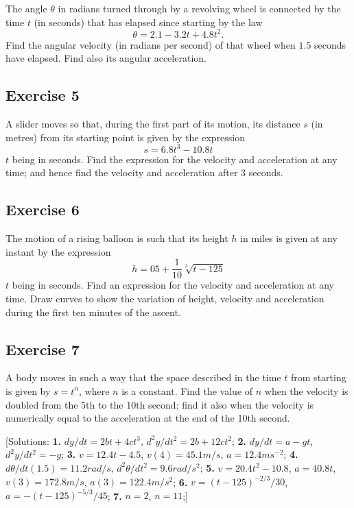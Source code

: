 \documentclass[
  english,
  11pt,
  oneside]{book}
\newcommand{\slide}{}
\theoremstyle{definition}
\theoremstyle{definition}
\theoremstyle{definition}
\theoremstyle{definition}
\theoremstyle{remark}
\begin{document}
The angle \(\theta\) in radians turned through by a revolving wheel is connected by the time \(t\) (in seconds) that has elapsed since starting by the law
\[\theta = 2.1 - 3.2t + 4.8t^2.\]
Find the angular velocity (in radians per second) of that wheel when \(1.5\) seconds have elapsed. Find also its angular acceleration.

\slide

\subsection*{Exercise 5}\label{exercise-5-1}

A slider moves so that, during the first part of its motion, its distance \(s\) (in metres) from its starting point is given by the expression
\[s = 6.8t^3 - 10.8t\]
\(t\) being in seconds. Find the expression for the velocity and acceleration at any time; and hence find the velocity and acceleration after \(3\) seconds.

\slide

\subsection*{Exercise 6}\label{exercise-6-1}

The motion of a rising balloon is such that its height \(h\) in miles is given at any instant by the expression
\[h = 05+ \frac1{10}\sqrt[3]{t-125}\]
\(t\) being in seconds. Find an expression for the velocity and acceleration at any time. Draw curves to show the variation of height, velocity and acceleration during the first ten minutes of the ascent.

\slide

\subsection*{Exercise 7}\label{exercise-7}

A body moves in such a way that the space described in the time \(t\) from starting is given by \(s = t^n\), where \(n\) is a constant. Find the value of \(n\) when the velocity is doubled from the 5th to the 10th second; find it also when the velocity is numerically equal to the acceleration at the end of the 10th second.

{[}Solutions:
\textbf{1.} \(dy/dt=2bt+4ct^3\), \(d^2y/dt^2=2b+12ct^2\);
\textbf{2.} \(dy/dt=a-gt\), \(d^2y/dt^2=-g\);
\textbf{3.} \(v=12.4t-4.5\), \(v(4)=45.1m/s\), \(a=12.4ms^{-2}\);
\textbf{4.} \(d\theta/dt(1.5)=11.2rad/s\), \(d^2\theta/dt^2 = 9.6rad/s^2\);
\textbf{5.} \(v=20.4t^2-10.8\), \(a=40.8t\), \(v(3)=172.8m/s\), \(a(3)=122.4m/s^2\);
\textbf{6.} \(v=(t-125)^{-2/3}/30\), \(a=-(t-125)^{-5/3}/45\);
\textbf{7.} \(n=2\), \(n=11\);{]}
\end{document}
